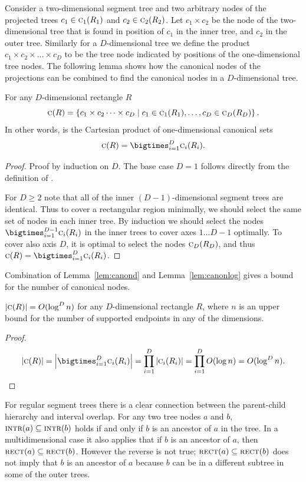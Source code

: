 \documentclass[english,gradu]{tktltiki2018}
\begin{document}
Consider a two-dimensional segment tree and two arbitrary nodes of the projected trees $c_1\in\canoni{R_1}{1}$ and $c_2\in\canoni{R_2}{2}$.
Let $c_1\times c_2$ be the node of the two-dimensional tree that is found in position of $c_1$ in the inner tree, and $c_2$ in the outer tree.
Similarly for a $D$-dimensional tree we define the product $c_1\times c_2\times\dots\times c_D$ to be the tree node indicated by positions of the one-dimensional tree nodes.
The following lemma shows how the canonical nodes of the projections can be combined to find the canonical nodes in a $D$-dimensional tree.

\begin{lem}\label{lem:canond}
For any $D$-dimensional rectangle $R$
$$\canon{R}=\set{c_1\times c_2\dots\times c_D \mid c_1\in\canoni{R_1}{1}, \dots, c_D\in\canoni{R_D}{D}}.$$
In other words,  is the Cartesian product of one-dimensional canonical sets
$$\canon{R}=\bigtimes_{i=1}^D \canoni{R_i}{i}.$$
\end{lem}
\begin{proof}
Proof by induction on $D$.
The base case $D=1$ follows directly from the definition of .

For $D\ge 2$ note that all of the inner $(D-1)$-dimensional segment trees are identical.
Thus to cover a rectangular region minimally, we should select the same set of nodes in each inner tree.
By induction we should select the nodes $\bigtimes_{i=1}^{D-1} \canoni{R_i}{i}$ in the inner trees to cover axes $1\dots D-1$ optimally.
To cover also axis $D$, it is optimal to select the nodes $\canoni{R_D}{D}$, and thus $\canon{R}=\bigtimes_{i=1}^D\canoni{R_i}{i}$.
\end{proof}

Combination of Lemma~\ref{lem:canond} and Lemma~\ref{lem:canonlog} gives a bound for the number of canonical nodes.

\begin{cor}\label{cor:canondcount}$\size{\canon{R}}=O(\log^D\segsize)$ for any $D$-dimensional rectangle $R$, where $n$ is an upper bound for the number of supported endpoints in any of the dimensions.\end{cor}
\begin{proof}
$$
\size{\canon{R}} = \size{\bigtimes_{i=1}^D \canoni{R_i}{i}}
= \prod_{i=1}^D \size{\canoni{R_i}{i}}
= \prod_{i=1}^D O(\log\segsize)
= O(\log^D\segsize).
$$
\end{proof}

For regular segment trees there is a clear connection between the parent-child hierarchy and interval overlap.
For any two tree nodes $a$ and $b$, $\inter{a}\subseteq\inter{b}$ holds if and only if $b$ is an ancestor of $a$ in the tree.
In a multidimensional case it also applies that if $b$ is an ancestor of $a$, then $\rect{a}\subseteq\rect{b}$.
However the reverse is not true; $\rect{a}\subseteq\rect{b}$ does not imply that $b$ is an ancestor of $a$ because $b$ can be in a different subtree in some of the outer trees.
\end{document}
